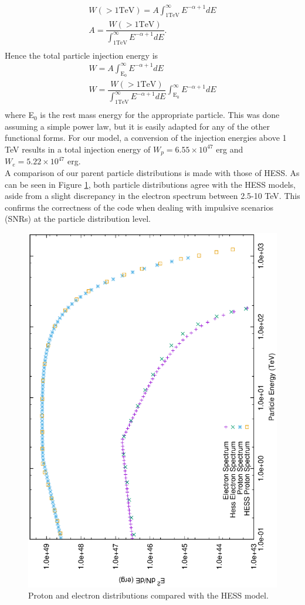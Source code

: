 \documentclass[12pt,a4paper]{article}
\begin{document}
\begin{equation*}
\begin{split}
W\mathrm{(>1TeV)} = A\int_{1 \mathrm{TeV}}^{\infty}  E^{-\alpha + 1} dE\\
A = \dfrac{W\mathrm{(>1TeV)}}{\int_{1 \mathrm{TeV}}^{\infty}  E^{-\alpha + 1} dE}.\\
\end{split}
\end{equation*}
Hence the total particle injection energy is
\begin{equation} \label{eq:renormal}
\begin{split}
W = A\int_{\mathrm{E_0}}^{\infty}  E^{-\alpha + 1} dE\\
W = \dfrac{W\mathrm{(>1TeV)}}{\int_{1 \mathrm{TeV}}^{\infty}  E^{-\alpha + 1} dE}\int_{\mathrm{E_0}}^{\infty}  E^{-\alpha + 1} dE\\
\end{split}
\end{equation}
where E$_0$ is the rest mass energy for the appropriate particle. This was done assuming a simple power law, but it is easily adapted for any of the other functional forms. For our model, a conversion of the injection energies above 1 TeV results in a total injection energy of $W_p = 6.55 \times 10^{47}$ erg and $W_e  = 5.22 \times 10^{47}$ erg. \\

A comparison of our parent particle distributions is made with those of HESS. As can be seen in Figure \ref{fig:rxj1713spectrumboth}, both particle distributions agree with the HESS models, aside from a slight discrepancy in the electron spectrum between 2.5-10 TeV. This confirms the correctness of the code when dealing with impulsive scenarios (SNRs) at the particle distribution level.
\begin{figure}[H]
	\centering
	\includegraphics[width=0.52\linewidth, height=0.4\textheight, angle=-90]{rxj1713_spectrum_both.ps}
	\caption{Proton and electron distributions compared with the HESS model.}
	\label{fig:rxj1713spectrumboth}
\end{figure}
\end{document}
